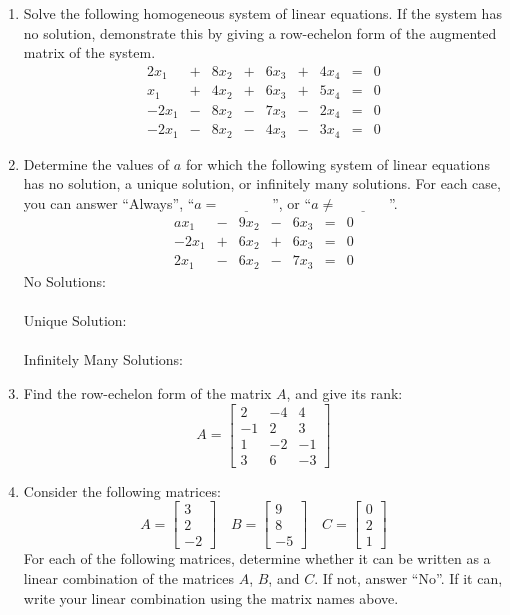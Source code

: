 \documentclass[letterpaper,12pt]{article}
\begin{document}
\begin{enumerate}
\item Solve the following homogeneous system of linear equations. If the system has no solution, demonstrate this by giving a row-echelon form of the augmented matrix of the system.
\[
 \begin{array}{ccccccccc}
2x_1&+&8x_2&+&6x_3&+&4x_4&=&0\\
x_1&+&4x_2&+&6x_3&+&5x_4&=&0\\
-2x_1&-&8x_2&-&7x_3&-&2x_4&=&0\\
-2x_1&-&8x_2&-&4x_3&-&3x_4&=&0  
 \end{array}
\]
\newpage
\item Determine the values of $a$ for which the following system of linear equations has no solution, a unique solution, or infinitely many solutions. For each case, you can answer ``Always'', ``$a=\underline{\phantom{aaaaaaa}}$'', or ``$a\neq\underline{\phantom{aaaaaaa}}$''.
\[
 \begin{array}{ccccccc}
  ax_1&-&9x_2&-&6x_3&=&0\\
-2x_1&+&6x_2&+&6x_3&=&0\\
2x_1&-&6x_2&-&7x_3&=&0
 \end{array}
\]
No Solutions:\\
\\
Unique Solution:\\
\\
Infinitely Many Solutions:
\\
\item Find the row-echelon form of the matrix $A$, and give its rank:
\[
 A=\begin{bmatrix}2&-4&4\\-1&2&3\\1&-2&-1\\3&6&-3\end{bmatrix}
\]
\item Consider the following matrices:
\[
 A = \begin{bmatrix}
      3\\2\\-2
     \end{bmatrix}\quad B = \begin{bmatrix}9\\8\\-5\end{bmatrix} \quad C = \begin{bmatrix}0\\2\\1\end{bmatrix}
\]
For each of the following matrices, determine whether it can be written as a linear combination of the matrices $A$, $B$, and $C$. If not, answer ``No''. If it can, write your linear combination using the matrix names above.

\end{enumerate}
\end{document}

